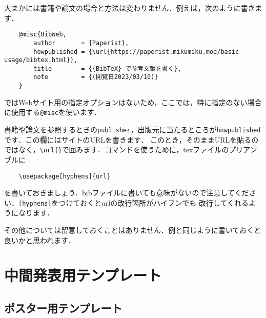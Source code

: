 \documentclass[a4paper, 11pt, uplatex]{jsreport}
\numberwithin{equation}{section}
\theoremstyle{definition}
\begin{document}
大まかには書籍や論文の場合と方法は変わりません．例えば，次のように書きます\cite{BibWeb}．
\begin{verbatim}
    @misc{BibWeb,
        author       = {Paperist},
        howpublished = {\url{https://paperist.mikumiku.moe/basic-usage/bibtex.html}},
        title        = {{BibTeX} で参考文献を書く},
        note         = {(閲覧日2023/03/10)}
    }
\end{verbatim}

{\BibTeX}ではWebサイト用の指定オプションはないため，ここでは，特に指定のない場合に使用する\verb|@misc|を使います．

書籍や論文を参照するときの\verb|publisher|，出版元に当たるところが\verb|howpublished|です．この欄にはサイトのURLを書きます．
このとき，そのままURLを貼るのではなく，\verb|\url{}|で囲みます．コマンドを使うために，texファイルのプリアンブルに
\begin{verbatim}
    \usepackage[hyphens]{url}
\end{verbatim}
を書いておきましょう．bibファイルに書いても意味がないので注意してください．\verb|[hyphens]|をつけておくとurlの改行箇所がハイフンでも
改行してくれるようになります．

その他については留意しておくことはありません．例と同じように書いておくと良いかと思われます．



\chapter{中間発表用テンプレート}


\section{ポスター用テンプレート}
\end{document}
